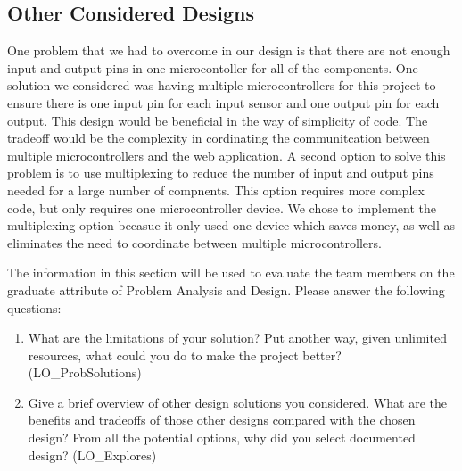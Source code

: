 \documentclass[12pt, titlepage]{article}
\begin{document}
\subsection*{Other Considered Designs}
One problem that we had to overcome in our design is that there are not enough input and output pins in one microcontoller for all of the components.
One solution we considered was having multiple microcontrollers for this project to ensure there is one input pin for each input sensor and one output pin for each output.
This design would be beneficial in the way of simplicity of code. The tradeoff would be the complexity in cordinating the communitcation between multiple microcontrollers and the 
web application. A second option to solve this problem is to use multiplexing to reduce the number of input and output pins needed for a large number of compnents. 
This option requires more complex code, but only requires one microcontroller device. We chose to implement the multiplexing option becasue it only used one device which saves money,
as well as eliminates the need to coordinate between multiple microcontrollers. 

The information in this section will be used to evaluate the team members on the
graduate attribute of Problem Analysis and Design.  Please answer the following questions:

\begin{enumerate}
  \item What are the limitations of your solution?  Put another way, given
  unlimited resources, what could you do to make the project better? (LO\_ProbSolutions)
  \item Give a brief overview of other design solutions you considered.  What
  are the benefits and tradeoffs of those other designs compared with the chosen
  design?  From all the potential options, why did you select documented design?
  (LO\_Explores)
\end{enumerate}
\end{document}
